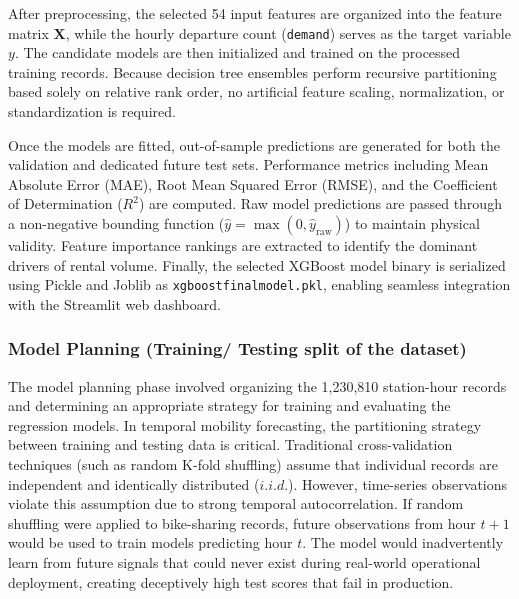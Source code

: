 \documentclass[12pt, a4paper]{article}
\renewcommand{\_}{\textunderscore\allowbreak}
\begin{document}
After preprocessing, the selected 54 input features are organized into the feature matrix $\mathbf{X}$, while the hourly departure count (\texttt{demand}) serves as the target variable $y$. The candidate models are then initialized and trained on the processed training records. Because decision tree ensembles perform recursive partitioning based solely on relative rank order, no artificial feature scaling, normalization, or standardization is required.

Once the models are fitted, out-of-sample predictions are generated for both the validation and dedicated future test sets. Performance metrics including Mean Absolute Error (MAE), Root Mean Squared Error (RMSE), and the Coefficient of Determination ($R^2$) are computed. Raw model predictions are passed through a non-negative bounding function ($\hat{y} = \max(0, \hat{y}_{\text{raw}})$) to maintain physical validity. Feature importance rankings are extracted to identify the dominant drivers of rental volume. Finally, the selected XGBoost model binary is serialized using Pickle and Joblib as \texttt{xgboost\_final\_model.pkl}, enabling seamless integration with the Streamlit web dashboard.

\subsubsection{Model Planning (Training/ Testing split of the dataset)}
The model planning phase involved organizing the 1,230,810 station-hour records and determining an appropriate strategy for training and evaluating the regression models. In temporal mobility forecasting, the partitioning strategy between training and testing data is critical. Traditional cross-validation techniques (such as random K-fold shuffling) assume that individual records are independent and identically distributed ($i.i.d.$). However, time-series observations violate this assumption due to strong temporal autocorrelation. If random shuffling were applied to bike-sharing records, future observations from hour $t+1$ would be used to train models predicting hour $t$. The model would inadvertently learn from future signals that could never exist during real-world operational deployment, creating deceptively high test scores that fail in production.
\end{document}
